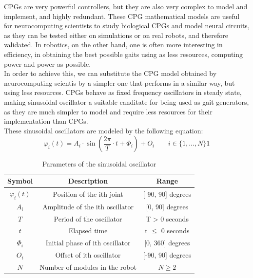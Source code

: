 CPGs are very powerful controllers, but they are also very complex to model and implement, and highly redundant. These CPG mathematical models are useful for neurocomputing scientists to study biological CPGs and model neural circuits, as they can be tested either on simulations or on real robots, and therefore validated. In robotics, on the other hand, one is often more interesting in efficiency, in obtaining the best possible gaits using as less resources, computing power and power as possible.\\

In order to achieve this, we can substitute the CPG model obtained by neurocomputing scientis by a simpler one that performs in a similar way, but using less resources. CPGs behave as fixed frequency oscillators in steady state, making sinusoidal oscillator a suitable canditate for being used as gait generators, as they are much simpler to model and require less resources for their implementation than CPGs.\\

These sinusoidal oscillators are modeled by the following equation:
\begin{equation} \label{eq:sinusoidal_oscillator}
\varphi_i(t) = A_i \cdot \sin{\left( \frac{2\pi}{T} \cdot t + \Phi_i \right)} + O_i \qquad i \in \lbrace 1, ..., N \rbrace 1
\end{equation}


\begin{table}[h]
\centering
\begin{tabular}{|c||c|c|} \hline
Symbol & Description & Range \\ \hline \hline
$\varphi_i(t)$ & Position of the ith joint & [-90, 90] degrees \\ \hline
$A_i$ & Amplitude of the ith oscillator & [0, 90] degrees \\ \hline
$T$ & Period of the oscillator &  T > 0 seconds \\ \hline
$t$ & Elapsed time & t $\leq$ 0 seconds \\ \hline
$\Phi_i$ & Initial phase of ith oscillator & [0, 360] degrees \\ \hline
$O_i$ & Offset of ith oscillator & [-90, 90] degrees \\ \hline
$N$ & Number of modules in the robot & $N \geq 2$ \\ \hline
\end{tabular}
\caption{Parameters of the sinusoidal oscillator}
\end{table}


